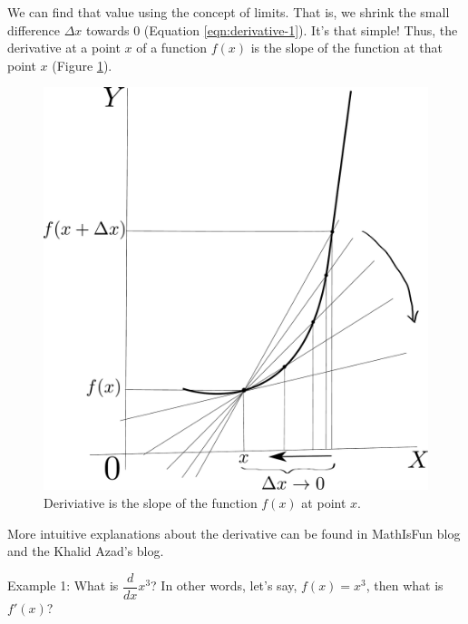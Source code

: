 \documentclass[conference,final,11pt,technote,onecolumn]{IEEEtran}\usepackage[]{graphicx}\usepackage[]{color}
\begin{document}
We can find that value using the concept of limits. That is, we shrink the small difference $\Delta x$ towards 0 (Equation \ref{eqn:derivative-1}). It's that simple! Thus, the derivative at a point $x$ of a function $f(x)$ is the slope of the function at that point $x$ (Figure \ref{fig:derivative-2}).
\begin{figure}[!th]
	\centering
	\includegraphics[scale=0.25]{figures/derivative-2.pdf}
	\caption{Deriviative is the slope of the function $f(x)$ at point $x$.\label{fig:derivative-2}}
\end{figure}

More intuitive explanations about the derivative can be found in MathIsFun blog\cite{introduction_to_derivatives} and the Khalid Azad's blog\cite{intuition_for_the_derivative}.

Example 1:  What is $\dfrac{d}{dx} x^3$? In other words, let's say, $f(x) = x^3$, then what is $f'(x)$?
\end{document}
